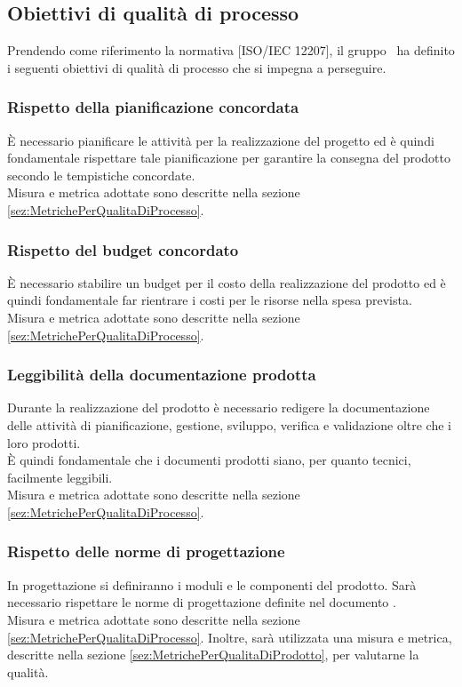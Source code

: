 \documentclass[../PianoDiQualifica.tex]{subfiles}
\begin{document}
		\subsection{Obiettivi di qualità di processo}\label{sez:obiettiviQualitaProcesso}
			Prendendo come riferimento la normativa [ISO/IEC 12207], il gruppo \kaleidoscode\ ha
			definito i seguenti obiettivi di qualità di processo che si impegna a perseguire.
			\subsubsection{Rispetto della pianificazione concordata}
				È necessario pianificare le attività per la realizzazione del progetto ed è
				quindi fondamentale rispettare tale pianificazione per garantire la consegna
				del prodotto secondo le tempistiche concordate.\\
				Misura e metrica adottate sono descritte nella sezione \ref{sez:MetrichePerQualitaDiProcesso}.
			\subsubsection{Rispetto del budget concordato}
				È necessario stabilire un budget per il costo della realizzazione del prodotto ed è
				quindi fondamentale far rientrare i costi per le risorse nella spesa prevista.\\
				Misura e metrica adottate sono descritte nella sezione \ref{sez:MetrichePerQualitaDiProcesso}.
			\subsubsection{Leggibilità della documentazione prodotta}
				Durante la realizzazione del prodotto è necessario redigere la documentazione
				delle attività di pianificazione, gestione, sviluppo, verifica e validazione oltre
				che i loro prodotti.\\
				È quindi fondamentale che i documenti prodotti siano, per quanto tecnici,
				facilmente leggibili.\\
				Misura e metrica adottate sono descritte nella sezione \ref{sez:MetrichePerQualitaDiProcesso}.
			\subsubsection{Rispetto delle norme di progettazione}
				In progettazione si definiranno i moduli e le componenti del prodotto. Sarà necessario
				rispettare le norme di progettazione definite nel documento \normediprogetto.\\
				Misura e metrica adottate sono descritte nella sezione \ref{sez:MetrichePerQualitaDiProcesso}.
				Inoltre, sarà utilizzata una misura e metrica, descritte nella sezione
				\ref{sez:MetrichePerQualitaDiProdotto}, per valutarne la qualità.
\end{document}
